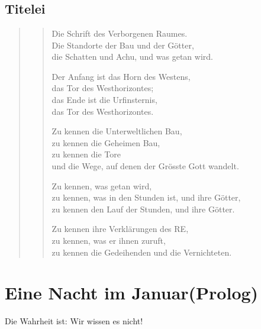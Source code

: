 \documentclass[11pt,titlepage,a5paper]{book}
\newenvironment{tg}{\begin{quote}\em}{\end{quote}}
\begin{document}
\thispagestyle{empty}


\chapter*{}

\section*{Titelei}

\begin{tg}
\begin{verse}



Die Schrift des Verborgenen Raumes.\\
Die Standorte der Bau und der Götter,\\
die Schatten und Achu, und was getan wird.

Der Anfang ist das Horn des Westens,\\
das Tor des Westhorizontes;\\
das Ende ist die Urfinsternis,\\
das Tor des Westhorizontes.

Zu kennen die Unterweltlichen Bau,\\
zu kennen die Geheimen Bau,\\
zu kennen die Tore\\
und die Wege, auf denen der Grösste Gott wandelt.

Zu kennen, was getan wird,\\
zu kennen, was in den Stunden ist, und ihre Götter,\\
zu kennen den Lauf der Stunden, und ihre Götter.


Zu kennen ihre Verklärungen des RE,\\
zu kennen, was er ihnen zuruft,\\
zu kennen die Gedeihenden und die Ver\-nich\-te\-ten.{}\\

\end{verse}
\end{tg}



\chapter*{Eine Nacht im Januar(Prolog)}

Die Wahrheit ist: Wir wissen es nicht! 
\end{document}
